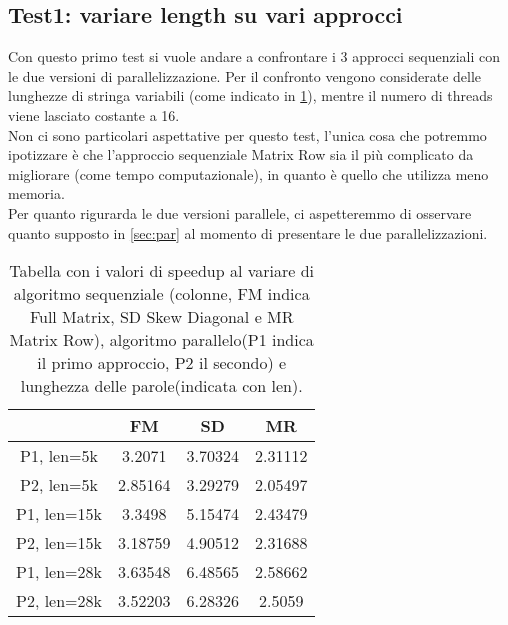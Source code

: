 \documentclass[10pt,twocolumn,letterpaper]{article}
\begin{document}
\subsection{Test1: variare length su vari approcci}
\label{sec:t1}
Con questo primo test si vuole andare a confrontare i 3 approcci sequenziali con le due versioni di parallelizzazione. Per il confronto vengono considerate delle lunghezze di stringa variabili (come indicato in \cref{table:t1}), mentre il numero di threads viene lasciato costante a 16.\\
Non ci sono particolari aspettative per questo test, l'unica cosa che potremmo ipotizzare è che l'approccio sequenziale Matrix Row sia il più complicato da migliorare (come tempo computazionale), in quanto è quello che utilizza meno memoria.\\
Per quanto rigurarda le due versioni parallele, ci aspetteremmo di osservare quanto supposto in \cref{sec:par} al momento di presentare le due parallelizzazioni.

\begin{table}[h]
\centering
\begin{tabular}{ |c|c|c|c| } 
\hline
 & FM & SD & MR\\
\hline
P1, len=5k & 3.2071 & 3.70324 & 2.31112\\
\hline
P2, len=5k & 2.85164 & 3.29279 & 2.05497\\
\hline
P1, len=15k & 3.3498 & 5.15474 & 2.43479\\
\hline
P2, len=15k & 3.18759 & 4.90512 & 2.31688\\
\hline
P1, len=28k & 3.63548 & 6.48565 & 2.58662\\
\hline
P2, len=28k & 3.52203 & 6.28326 & 2.5059\\
\hline
\end{tabular}
\vspace*{3mm}
\caption{Tabella con i valori di speedup al variare di algoritmo sequenziale (colonne, FM indica Full Matrix, SD Skew Diagonal e MR Matrix Row), algoritmo parallelo(P1 indica il primo approccio, P2 il secondo) e lunghezza delle parole(indicata con len). }
\label{table:t1}
\end{table}
\end{document}
